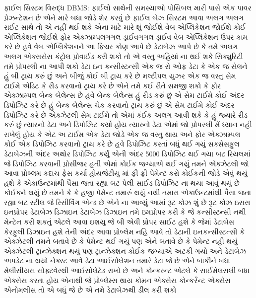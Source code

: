 \documentclass[aspectratio=169, 10pt]{beamer}
\begin{document}
\begin{frame}{ફાઈલ સિસ્ટમ વિરુદ્ધ DBMS: ફાઈલો સાથેની સમસ્યાઓ}
{પોસિબલ મારી પાસે એક પાવર પ્રેઝન્ટેશન છે એને મારે બધા જોડે શેર કરવું છે ફાઈલ બેઝ સિસ્ટમ આવા અલગ અલગ રાઈટ સાથે તો એ નહીં થઈ શકે એના માટે મારે શું જોઈશે વેબ એપ્લિકેશન જોઈશે કોઈ એપ્લિકેશન જોઈશે ફોર એક્ઝામ્પલગગલ ડ્રાઈવગગલ ડ્રાઈવ વેબ એપ્લિકેશન ઉપર કામ કરે છે હવે વેબ એપ્લિકેશનને આ ફિચર કોણ આપે છે ડેટાબેઝ આપે છે કે તમે અલગ અલગ એક્સસેસ કંટ્રોલ પ્રોવાઈડ કરી શકો તો એ વસ્તુ અહિયાં ના થઈ શકે સિક્યુરિટી તમે પ્રોપરલી ના આપી શકો ડેટા ઇન કન્સીસ્ટન્સી એક જ રો ઓફ ડેટા કે એક જ સેલને હું બી ટ્રાય કરું છું અને બીજું કોઈ બી ટ્રાય કરે છે મલ્ટીપલ યુઝર એક જ વસ્તુ સેમ ટાઈમે એડિટ કે રીડ કરવાનો ટ્રાય કરે છે એને તમે કઈ રીતે સમજી શકો કે ફોર એક્ઝામ્પલ બેન્ક બેલેન્સ છે હવે બેન્ક બેલેન્સ હું રીડ કરું છું એ સેમ ટાઈમે કોઈ અંદર ડિપોઝિટ કરે છે હું બેન્ક બેલેન્સ ચેક કરવાનો ટ્રાય કરું છું એ સેમ ટાઈમે કોઈ અંદર ડિપોઝિટ કરે છે એક્ઝેટલી સેમ ટાઈમે તો એમાં કંઈક અલગ આવી શકે કે હું જ્યારે રીડ કરું છું ત્યારનો ડેટા અને ડિપોઝિટ કર્યો હોય ત્યારનો ડેટા એમાં જો પ્રોપરલી મેં ધ્યાન નહી રાખેલું હોય કે એટ અ ટાઈમ એક ડેટા જોડે એક જ વસ્તુ થાય અને ફોર એક્ઝામ્પલ કોઈ એક ડિપોઝિટ કરવાનો ટ્રાય કરે છે હવે ડિપોઝિટ કરતાં બધું થઈ ગયું સક્સેસફુલ ડેટાબેઝની અંદર અથોર ડિપોઝિટ કર્યું એની અંદર 5000 ડિપોઝિટ થઈ ગયા બટ રિયલમાં જે ડિપોઝિટ કરવાની પ્રોસીજર હતી એમાં કોઈક જગ્યાએ થઈ ગયું તમને એક્ઝેટલી જો આવા પ્રોબ્લમ કદાચ ફેસ કર્યા હોયજેટીયુ માં ફી ફ્રી પેમેન્ટ કરો કોઈકની જોડે એવું થયું હશે કે એકાઉન્ટમાંથી પૈસા જતા રહ્યા બટ પેલી સાઈડ ડિપોઝિટ ના થયા આવું થયું છે કોઈકને થયું છે તમને કે કે હજી પેમેન્ટ તમારું થયું નથી તમારા એકાઉન્ટમાંથી પૈસા જતા રહ્યા બટ સ્ટીલ જે રિસીવિંગ એન્ડ છે એને ના આવ્યું આમાં રૂટ કોઝ શું છે રૂટ કોઝ ઇસસ ઇનપ્રોપર ડેટાબેઝ ડિઝાઇન ડેટાબેઝ ડિઝાઇન તમે ઇમપ્રોપર કરી કે જે કન્સીસ્ટન્સી નથી મેન્ટેન કરી શકતું એટલે આવા ઇશયુ જે બી એવી પ્રોપર સાઈટ હશે કે જેમાં ડેટાબેસ કેરફુલી ડિઝાઇન હશે તેની અંદર આવા પ્રોબ્લેમ નહિ આવે તો ડેટાની ઇનકન્સીસ્ટન્સી કે એક્ઝેટલી તમને બતાવે છે કે પેમેન્ટ થઈ ગયું પણ એને બતાવે છે કે પેમેન્ટ નહી થયું એક્ઝેટલી ટ્રાન્ઝેક્શન થયું પણ ટ્રાન્ઝેક્શન કોઈક જગ્યાએ અટકી ગયો અને ડેટાબેઝ અપડેટ ના થયો નેક્સ્ટ આવે ડેટા આઈસોલેશન તમારે ડેટા જે છે એને બાકીને બધા મેલીસીયસ સોફ્ટવેરથી આઈસોલેટેડ રાખો છે અને કોન્કરન્ટ એટલે કે સાઈમેલસલી બધા એક્સેસ કરતા હોય એનાથી જે પ્રોબ્લેમ્સ થાય કોમન એક્સેસ કોન્કર્રેન્ટ એક્સેસ એનોમલીસ તો એ બધું જે છે એ તમે ડેટાબેઝથી ડીલ કરી શકો
}
\end{frame}
\end{document}

